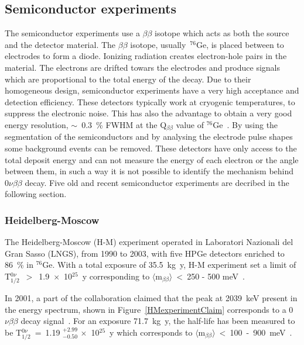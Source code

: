 \documentclass[main.tex]{subfiles}
\begin{document}
\subsection{Semiconductor experiments}


\NI The semiconductor experiments use a $\beta\beta$ isotope which acts as both the source and the detector material. The $\beta\beta$ isotope, usually~$^{\text{76}}$Ge, is placed between to electrodes to form a diode. Ionizing radiation creates electron-hole pairs in the material. The electrons are drifted towars the electrodes and produce signals which are proportional to the total energy of the decay. Due to their homogeneous design, semiconductor experiments have a very high acceptance and detection efficiency. These detectors typically work at cryogenic temperatures, to suppress the electronic noise. This has also the advantage to obtain a very good energy resolution, $\sim$~0.3~\% FWHM at the Q$_{\beta\beta}$ value of $^{\text{76}}$Ge~\cite{QbetabetaGe}. By using the segmentation of the semiconductors and by analysing the electrode pulse shapes some background events can be removed. These detectors have only access to the total deposit energy and can not measure the energy of each electron or the angle between them, in such a way it is not possible to identify the mechanism behind 0$\nu\beta\beta$ decay. Five old and recent semiconductor experiments are decribed in the following section.


\subsubsection{Heidelberg-Moscow}


\NI The Heidelberg-Moscow (H-M) experiment operated in Laboratori Nazionali del Gran Sasso (LNGS), from 1990 to 2003, with five HPGe detectors enriched to 86~\% in $^{\text{76}}$Ge. With a total exposure of 35.5~kg~y, H-M experiment set a limit of T$_{\text{1/2}}^{0\nu}$~$>$~1.9~$\times$~10$^{\text{25}}$~y corresponding to $\langle \text{m}_{\beta\beta} \rangle$~<~250 - 500 meV~\cite{HeidelbergMoscow1}.


\bigskip


\NI In 2001, a part of the collaboration claimed that the peak at 2039~keV present in the energy spectrum, shown in Figure~\ref{HMexperimentClaim} corresponds to a 0$\nu\beta\beta$ decay signal~\cite{HeidelbergMoscow2}. For an exposure 71.7~kg~y, the half-life has been measured to be T$_{\text{1/2}}^{0\nu}$~=~1.19 $^{\text{+2.99}}_{-\text{0.50}}$ $\times$~10$^{\text{25}}$~y which corresponds to $\langle \text{m}_{\beta\beta} \rangle$~<~100~-~900~meV~\cite{HeidelbergMoscow2}.
\end{document}
